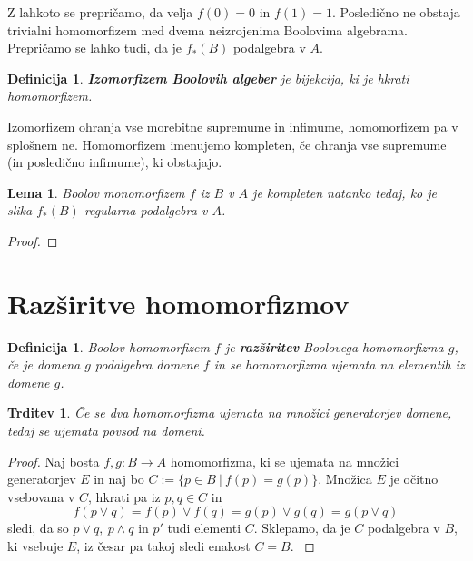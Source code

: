 \documentclass{amsart}
\newtheorem{lema}[izrek]{Lema}
\newtheorem{trditev}[izrek]{Trditev}
\newtheorem{definicija}[izrek]{Definicija}
\begin{document}
Z lahkoto se prepričamo, da velja \(f(0) = 0\) in \(f(1) = 1\). Posledično ne obstaja trivialni homomorfizem med dvema
neizrojenima Boolovima algebrama. Prepričamo se lahko tudi, da je \(f_{*}(B)\) podalgebra v \(A\).

\begin{definicija}
    \textbf{Izomorfizem Boolovih algeber} je bijekcija, ki je hkrati homomorfizem.
\end{definicija}

Izomorfizem ohranja vse morebitne supremume in infimume, homomorfizem pa 
v splošnem ne. Homomorfizem imenujemo kompleten, če ohranja vse supremume (in posledično infimume), ki obstajajo.

\begin{lema}
    Boolov monomorfizem $f$ iz $B$ v $A$ je kompleten natanko tedaj, ko 
    je slika \(f_{*}(B)\) regularna podalgebra v $A$.
\end{lema}

\begin{proof}
    
\end{proof}

\section{Razširitve homomorfizmov}

\begin{definicija}
    Boolov homomorfizem $f$ je \textbf{razširitev} Boolovega homomorfizma $g$, če je 
    domena $g$ podalgebra domene $f$ in se homomorfizma ujemata na elementih iz domene $g$.
\end{definicija}


\begin{trditev}
    Če se dva homomorfizma ujemata na množici generatorjev domene, tedaj se ujemata povsod na domeni.
\end{trditev}

\begin{proof}
    Naj bosta \(f,g : B \to A\) homomorfizma, ki se ujemata na množici generatorjev $E$ in naj bo
    \(C := \{p \in B~|~ f(p) = g (p)\}\). 
    Množica $E$ je očitno vsebovana v
    $C$, hkrati pa iz \(p,q \in C\) in 
    \[f(p \vee q) = f(p) \vee f(q) = g(p) \vee g(q) = g(p\vee q)\]
    sledi, da so \(p \vee q,~ p \wedge q\) in \(p'\) tudi elementi $C$.
    Sklepamo, da je $C$ podalgebra v $B$, ki vsebuje $E$, iz česar pa takoj sledi 
    enakost \(C = B\).
    \label{enolicno}
\end{proof}
\end{document}
